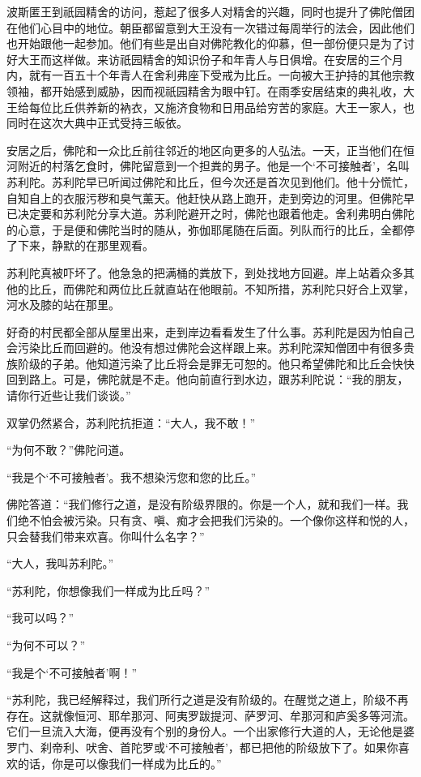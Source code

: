 \documentclass[12pt,twoside,openany]{book}
\begin{document}
波斯匿王到祇园精舍的访问，惹起了很多人对精舍的兴趣，同时也提升了佛陀僧团在他们心目中的地位。朝臣都留意到大王没有一次错过每周举行的法会，因此他们也开始跟他一起参加。他们有些是出自对佛陀教化的仰慕，但一部份便只是为了讨好大王而这样做。来访祇园精舍的知识份子和年青人与日俱增。在安居的三个月内，就有一百五十个年青人在舍利弗座下受戒为比丘。一向被大王护持的其他宗教领袖，都开始感到威胁，因而视祇园精舍为眼中钉。在雨季安居结束的典礼收，大王给每位比丘供养新的衲衣，又施济食物和日用品给穷苦的家庭。大王一家人，也同时在这次大典中正式受持三皈依。

安居之后，佛陀和一众比丘前往邻近的地区向更多的人弘法。一天，正当他们在恒河附近的村落乞食时，佛陀留意到一个担粪的男子。他是一个‘不可接触者’，名叫苏利陀。苏利陀早已听闻过佛陀和比丘，但今次还是首次见到他们。他十分慌忙，自知自上的衣服污秽和臭气薰天。他赶快从路上跑开，走到旁边的河里。但佛陀早已决定要和苏利陀分享大道。苏利陀避开之时，佛陀也跟着他走。舍利弗明白佛陀的心意，于是便和佛陀当时的随从，弥伽耶尾随在后面。列队而行的比丘，全都停了下来，静默的在那里观看。

苏利陀真被吓坏了。他急急的把满桶的粪放下，到处找地方回避。岸上站着众多其他的比丘，而佛陀和两位比丘就直站在他眼前。不知所措，苏利陀只好合上双掌，河水及膝的站在那里。

好奇的村民都全部从屋里出来，走到岸边看看发生了什么事。苏利陀是因为怕自己会污染比丘而回避的。他没有想过佛陀会这样跟上来。苏利陀深知僧团中有很多贵族阶级的子弟。他知道污染了比丘将会是罪无可恕的。他只希望佛陀和比丘会快快回到路上。可是，佛陀就是不走。他向前直行到水边，跟苏利陀说：“我的朋友，请你行近些让我们谈谈。”

双掌仍然紧合，苏利陀抗拒道：“大人，我不敢！”

“为何不敢？”佛陀问道。

“我是个‘不可接触者’。我不想染污您和您的比丘。”

佛陀答道：“我们修行之道，是没有阶级界限的。你是一个人，就和我们一样。我们绝不怕会被污染。只有贪、嗔、痴才会把我们污染的。一个像你这样和悦的人，只会替我们带来欢喜。你叫什么名字？”

“大人，我叫苏利陀。”

“苏利陀，你想像我们一样成为比丘吗？”

“我可以吗？”

“为何不可以？”

“我是个‘不可接触者’啊！”

“苏利陀，我已经解释过，我们所行之道是没有阶级的。在醒觉之道上，阶级不再存在。这就像恒河、耶牟那河、阿夷罗跋提河、萨罗河、牟那河和庐奚多等河流。它们一旦流入大海，便再没有个别的身份人。一个出家修行大道的人，无论他是婆罗门、刹帝利、吠舍、首陀罗或‘不可接触者’，都已把他的阶级放下了。如果你喜欢的话，你是可以像我们一样成为比丘的。”
\end{document}

